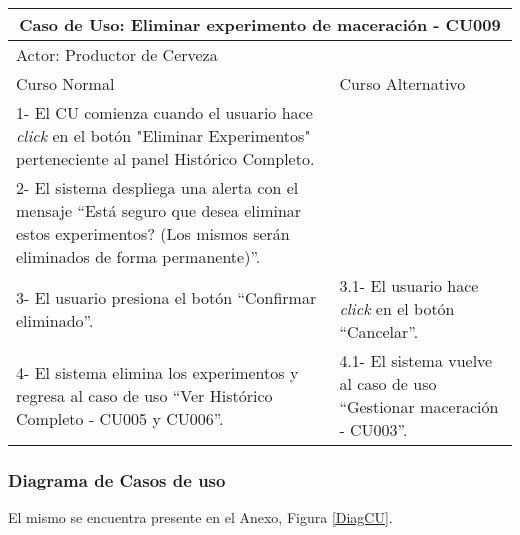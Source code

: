     \begin{table}[H]
    \begin{center}
    \begin{tabularx}{\textwidth}{ | X | X |}
        \hline
        \multicolumn{2}{|c|}{\textbf{Caso de Uso: Eliminar experimento de maceración - CU009}} \\
        \hline
        \multicolumn{2}{|l|}{Actor: Productor de Cerveza} \\
        \hline
        Curso Normal & Curso Alternativo \\
        \hline
        1- El CU comienza cuando el usuario hace \textit{click} en el botón "Eliminar Experimentos" perteneciente al panel Histórico Completo. & \\
        \hline
        2- El sistema despliega una alerta con el mensaje “Está seguro que desea eliminar estos experimentos? (Los mismos serán eliminados de forma permanente)”. &
        \\
        \hline
        3- El usuario presiona el botón “Confirmar eliminado”. & 3.1- El usuario hace \textit{click} en el botón “Cancelar”.
        \\
        \hline
        4- El sistema elimina los experimentos y regresa al caso de uso “Ver Histórico Completo - CU005 y CU006”. & 4.1- El sistema vuelve al caso de uso “Gestionar maceración - CU003”.
        \\
        \hline
    \end{tabularx}
    \label{CU009}
    \end{center}
    \end{table}
    
    \subsubsection{Diagrama de Casos de uso}
    El mismo se encuentra presente en el Anexo, Figura \ref{DiagCU}.

	
    
    
    
    

    